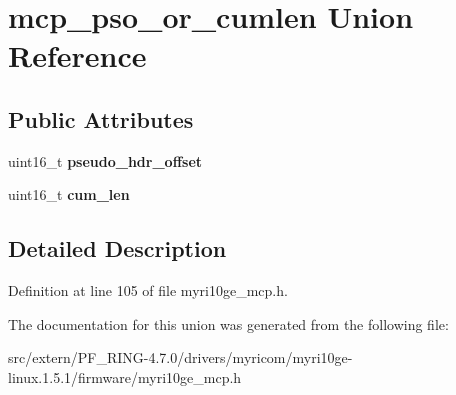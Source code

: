 \hypertarget{unionmcp__pso__or__cumlen}{
\section{mcp\_\-pso\_\-or\_\-cumlen Union Reference}
\label{unionmcp__pso__or__cumlen}
}
\subsection*{Public Attributes}
\begin{DoxyCompactItemize}
\item 
\hypertarget{unionmcp__pso__or__cumlen_a2abb0d275ae4a220620052f2fd3362ca}{
uint16\_\-t {\bfseries pseudo\_\-hdr\_\-offset}}
\label{unionmcp__pso__or__cumlen_a2abb0d275ae4a220620052f2fd3362ca}

\item 
\hypertarget{unionmcp__pso__or__cumlen_a02319593d9ae6fc020d48cd3f1eef6fc}{
uint16\_\-t {\bfseries cum\_\-len}}
\label{unionmcp__pso__or__cumlen_a02319593d9ae6fc020d48cd3f1eef6fc}

\end{DoxyCompactItemize}


\subsection{Detailed Description}


Definition at line 105 of file myri10ge\_\-mcp.h.



The documentation for this union was generated from the following file:\begin{DoxyCompactItemize}
\item 
src/extern/PF\_\-RING-\/4.7.0/drivers/myricom/myri10ge-\/linux.1.5.1/firmware/myri10ge\_\-mcp.h\end{DoxyCompactItemize}
